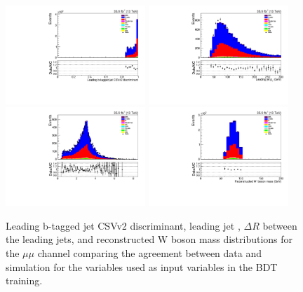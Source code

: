 \begin{figure}[htb]
\centering
\includegraphics[width=0.47\textwidth]{figs/background-estimation/plots/unblinded/prompt_mumu_ttbarInc/bTagDisc_NPL_mumu_wMass_mumu.pdf}
\includegraphics[width=0.47\textwidth]{figs/background-estimation/plots/unblinded/prompt_mumu_ttbarInc/leadingJetPt_NPL_mumu_wMass_mumu.pdf}
\\
\includegraphics[width=0.47\textwidth]{figs/background-estimation/plots/unblinded/prompt_mumu_ttbarInc/jjDelR_NPL_mumu_wMass_mumu.pdf}
\includegraphics[width=0.47\textwidth]{figs/background-estimation/plots/unblinded/prompt_mumu_ttbarInc/wPairMass_NPL_mumu_wMass_mumu.pdf}
\caption{
Leading b-tagged jet CSVv2 discriminant, leading jet \pT, $\Delta R$ between the leading jets, and reconstructed W boson mass distributions for the $\mu\mu$ channel comparing the agreement between data and simulation for the variables used as input variables in the BDT training.}
\label{fig:inputFeaturesDataSimAgreement11}
\end{figure}

